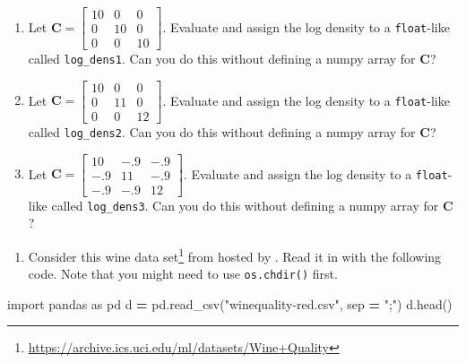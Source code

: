 \documentclass[
  12pt,
]{krantz}
\makeatletter
\newenvironment{Shaded}{\begin{snugshade}}{\end{snugshade}}
\newcommand{\ImportTok}[1]{#1}
\newcommand{\NormalTok}[1]{#1}
\newcommand{\OperatorTok}[1]{\textcolor[rgb]{0.43,0.43,0.43}{\textbf{#1}}}
\newcommand{\StringTok}[1]{\textcolor[rgb]{0.5,0.5,0.5}{#1}}
\providecommand{\tightlist}{%
  \setlength{\itemsep}{0pt}\setlength{\parskip}{0pt}}
\renewcommand{\href}[2]{#2\footnote{\url{#1}}}
\newenvironment{kframe}{%
\medskip{}
\setlength{\fboxsep}{.8em}
 \def\at@end@of@kframe{}%
 \ifinner\ifhmode%
  \def\at@end@of@kframe{\end{minipage}}%
  \begin{minipage}{\columnwidth}%
 \fi\fi%
 \def\FrameCommand##1{\hskip\@totalleftmargin \hskip-\fboxsep
 \colorbox{shadecolor}{##1}\hskip-\fboxsep
     \hskip-\linewidth \hskip-\@totalleftmargin \hskip\columnwidth}%
 \MakeFramed {\advance\hsize-\width
   \@totalleftmargin\z@ \linewidth\hsize
   \@setminipage}}%
 {\par\unskip\endMakeFramed%
 \at@end@of@kframe}
\renewenvironment{Shaded}{\begin{kframe}}{\end{kframe}}
\makeatother
\begin{document}
\begin{enumerate}
\def\labelenumi{\alph{enumi}.}
\item
  Let \(\mathbf{C} = \begin{bmatrix} 10 & 0 & 0 \\ 0 & 10 & 0 \\ 0 & 0 & 10 \end{bmatrix}\). Evaluate and assign the log density to a \texttt{float}-like called \texttt{log\_dens1}. Can you do this without defining a numpy array for \(\mathbf{C}\)?
\item
  Let \(\mathbf{C} = \begin{bmatrix} 10 & 0 & 0 \\ 0 & 11 & 0 \\ 0 & 0 & 12 \end{bmatrix}\). Evaluate and assign the log density to a \texttt{float}-like called \texttt{log\_dens2}. Can you do this without defining a numpy array for \(\mathbf{C}\)?
\item
  Let \(\mathbf{C} = \begin{bmatrix} 10 & -.9 & -.9 \\ -.9 & 11 & -.9 \\ -.9 & -.9 & 12 \end{bmatrix}\). Evaluate and assign the log density to a \texttt{float}-like called \texttt{log\_dens3}. Can you do this without defining a numpy array for \(\mathbf{C}\)?
\end{enumerate}

\begin{enumerate}
\def\labelenumi{\arabic{enumi}.}
\setcounter{enumi}{1}
\tightlist
\item
  Consider this \href{https://archive.ics.uci.edu/ml/datasets/Wine+Quality}{wine data set} from \citep{wine_data} hosted by \citep{uci_data}. Read it in with the following code. Note that you might need to use \texttt{os.chdir()} first.
\end{enumerate}

\begin{Shaded}
\begin{Highlighting}[]
\ImportTok{import}\NormalTok{ pandas }\ImportTok{as}\NormalTok{ pd}
\NormalTok{d }\OperatorTok{=}\NormalTok{ pd.read\_csv(}\StringTok{"winequality{-}red.csv"}\NormalTok{, sep }\OperatorTok{=} \StringTok{";"}\NormalTok{)}
\NormalTok{d.head()}
\end{Highlighting}
\end{Shaded}
\end{document}
